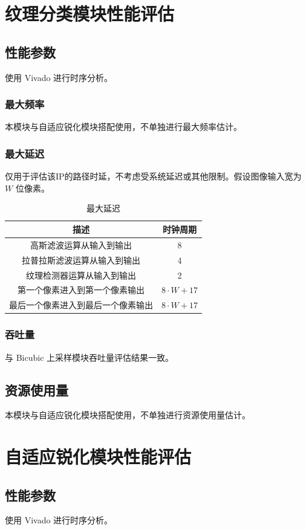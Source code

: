 \documentclass[12pt, a4paper, oneside]{ctexbook}
\begin{document}
	\section{纹理分类模块性能评估}
	\subsection{性能参数}
	使用 Vivado 进行时序分析。
	\subsubsection{最大频率}
	本模块与自适应锐化模块搭配使用，不单独进行最大频率估计。
	\subsubsection{最大延迟}
	仅用于评估该IP的路径时延，不考虑受系统延迟或其他限制。假设图像输入宽为 $W$ 位像素。
	\begin{table}[h]
		\centering
		\begin{tabular}{|c|c|}
			\hline
			\textbf{描述}       & \textbf{时钟周期}   \\ \hline
			高斯滤波运算从输入到输出      & 8               \\ \hline
			拉普拉斯滤波运算从输入到输出    & 4               \\ \hline
			纹理检测器运算从输入到输出     & 2               \\ \hline
			第一个像素进入到第一个像素输出   & $8\cdot W+17$   \\ \hline
			最后一个像素进入到最后一个像素输出 & $8\cdot W + 17$ \\ \hline
		\end{tabular}
		\caption{最大延迟}
	\end{table}
	\subsubsection{吞吐量}
	与 Bicubic 上采样模块吞吐量评估结果一致。
	\subsection{资源使用量}
	本模块与自适应锐化模块搭配使用，不单独进行资源使用量估计。
	
	
	\section{自适应锐化模块性能评估}
	\subsection{性能参数}
	使用 Vivado 进行时序分析。
\end{document}
